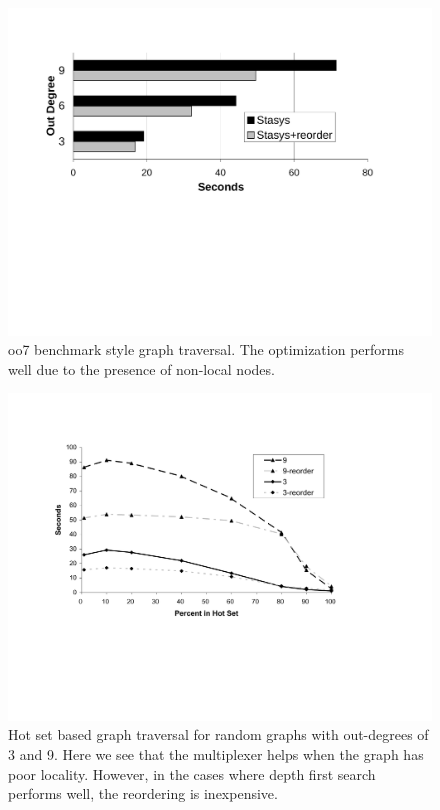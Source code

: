 \documentclass[letterpaper,twocolumn,10pt]{article}
\begin{document}
\begin{figure}[t]
\includegraphics[width=1\columnwidth]{figs/oo7.pdf}
\vspace{-15pt}
\caption{\sf\label{fig:oo7} oo7 benchmark style graph traversal.  The optimization performs well due to the presence of non-local nodes.}
\end{figure}

\begin{figure}[t]
\includegraphics[width=1\columnwidth]{figs/trans-closure-hotset.pdf}
\vspace{-12pt}
\caption{\sf\label{fig:hotGraph} Hot set based graph traversal for random graphs with out-degrees of 3 and 9.  Here
we see that the multiplexer helps when the graph has poor locality.
However, in the cases where depth first search performs well, the
reordering is inexpensive.}
\end{figure}
\end{document}
